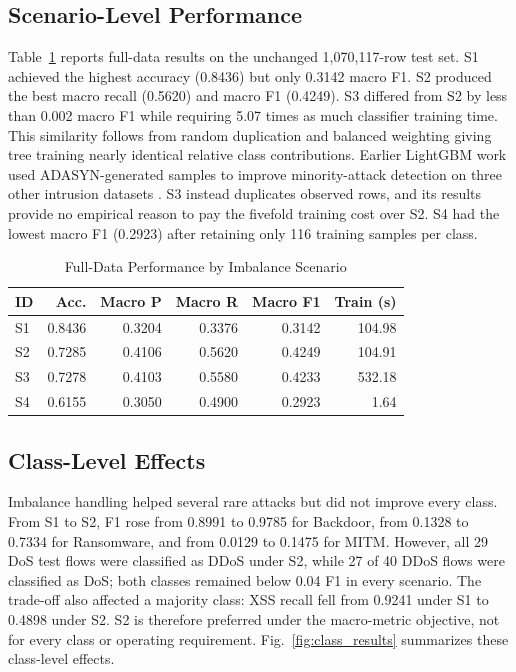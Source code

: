 \documentclass[conference]{IEEEtran}
\begin{document}
\subsection{Scenario-Level Performance}
Table~\ref{tab:scenario_results} reports full-data results on the unchanged 1,070,117-row test set. S1 achieved the highest accuracy (0.8436) but only 0.3142 macro F1. S2 produced the best macro recall (0.5620) and macro F1 (0.4249). S3 differed from S2 by less than 0.002 macro F1 while requiring 5.07 times as much classifier training time. This similarity follows from random duplication and balanced weighting giving tree training nearly identical relative class contributions. Earlier LightGBM work used ADASYN-generated samples to improve minority-attack detection on three other intrusion datasets \cite{Liu2021LightGBM}. S3 instead duplicates observed rows, and its results provide no empirical reason to pay the fivefold training cost over S2. S4 had the lowest macro F1 (0.2923) after retaining only 116 training samples per class.

\begin{table}[t]
\caption{Full-Data Performance by Imbalance Scenario}
\label{tab:scenario_results}
\centering
\scriptsize
\setlength{\tabcolsep}{2.2pt}
\renewcommand{\arraystretch}{0.96}
\begin{tabular}{@{}lrrrrr@{}}
\toprule
\textbf{ID} & \textbf{Acc.} & \textbf{Macro P} & \textbf{Macro R} & \textbf{Macro F1} & \textbf{Train (s)} \\
\midrule
S1 & 0.8436 & 0.3204 & 0.3376 & 0.3142 & 104.98 \\
S2 & 0.7285 & 0.4106 & 0.5620 & 0.4249 & 104.91 \\
S3 & 0.7278 & 0.4103 & 0.5580 & 0.4233 & 532.18 \\
S4 & 0.6155 & 0.3050 & 0.4900 & 0.2923 &   1.64 \\
\bottomrule
\end{tabular}
\end{table}

\subsection{Class-Level Effects}
Imbalance handling helped several rare attacks but did not improve every class. From S1 to S2, F1 rose from 0.8991 to 0.9785 for Backdoor, from 0.1328 to 0.7334 for Ransomware, and from 0.0129 to 0.1475 for MITM. However, all 29 DoS test flows were classified as DDoS under S2, while 27 of 40 DDoS flows were classified as DoS; both classes remained below 0.04 F1 in every scenario. The trade-off also affected a majority class: XSS recall fell from 0.9241 under S1 to 0.4898 under S2. S2 is therefore preferred under the macro-metric objective, not for every class or operating requirement. Fig.~\ref{fig:class_results} summarizes these class-level effects.
\end{document}
